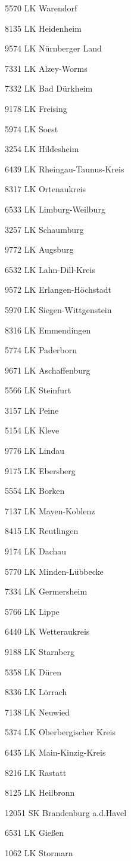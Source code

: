5570  LK Warendorf

8135  LK Heidenheim

9574  LK Nürnberger Land

7331  LK Alzey-Worms

7332  LK Bad Dürkheim

9178  LK Freising

5974  LK Soest

3254  LK Hildesheim

6439  LK Rheingau-Taunus-Kreis

8317  LK Ortenaukreis

6533  LK Limburg-Weilburg

3257  LK Schaumburg

9772  LK Augsburg

6532  LK Lahn-Dill-Kreis

9572  LK Erlangen-Höchstadt

5970  LK Siegen-Wittgenstein

8316  LK Emmendingen

5774  LK Paderborn

9671  LK Aschaffenburg

5566  LK Steinfurt

3157  LK Peine

5154  LK Kleve

9776  LK Lindau

9175  LK Ebersberg

5554  LK Borken

7137  LK Mayen-Koblenz

8415  LK Reutlingen

9174  LK Dachau

5770  LK Minden-Lübbecke

7334  LK Germersheim

5766  LK Lippe

6440  LK Wetteraukreis

9188  LK Starnberg

5358  LK Düren

8336  LK Lörrach

7138  LK Neuwied

5374  LK Oberbergischer Kreis

6435  LK Main-Kinzig-Kreis

8216  LK Rastatt

8125  LK Heilbronn

12051  SK Brandenburg a.d.Havel

6531  LK Gießen

1062  LK Stormarn

